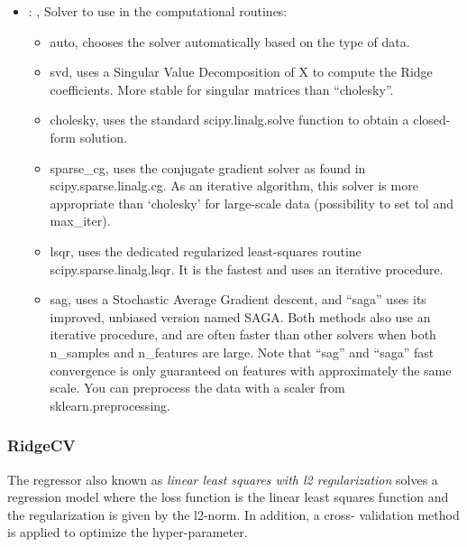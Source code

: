 \begin{itemize}
    \item {}: , 
      Solver to use in the computational routines:
      \begin{itemize}                                                    \item auto, chooses the
      solver automatically based on the type of data.
      \item svd, uses a Singular Value Decomposition of X to compute the Ridge coefficients. More
      stable for singular                                                                matrices
      than ``cholesky''.                                                    \item cholesky, uses the
      standard scipy.linalg.solve function to obtain a closed-form solution.
      \item sparse\_cg, uses the conjugate gradient solver as found in scipy.sparse.linalg.cg. As an
      iterative algorithm,                                                               this solver
      is more appropriate than ‘cholesky’ for large-scale data (possibility to set tol and
      max\_iter).                                                    \item lsqr, uses the dedicated
      regularized least-squares routine scipy.sparse.linalg.lsqr. It is the fastest and uses
      an iterative procedure.                                                    \item sag, uses a
      Stochastic Average Gradient descent, and ``saga'' uses its improved, unbiased version named
      SAGA.                                                               Both methods also use an
      iterative procedure, and are often faster than other solvers when both
      n\_samples and n\_features are large. Note that ``sag'' and ``saga'' fast convergence is only
      guaranteed on                                                               features with
      approximately the same scale. You can preprocess the data with a scaler from
      sklearn.preprocessing.                                                  \end{itemize}
  \end{itemize}


\subsubsection{RidgeCV}
  The  regressor also known as                              \textit{linear least
  squares with l2 regularization} solves a regression                              model where the
  loss function is the linear least squares function and the
  regularization is given by the l2-norm.                              In addition, a cross-
  validation method is applied to optimize the hyper-parameter.

